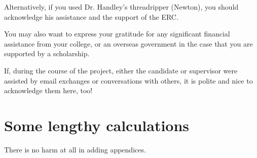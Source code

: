 \documentclass[aps,prd,reprint,preprintnumbers,showpacs,floatfix,nofootinbib,superscript address]{revtex4-2}
\begin{document}
Alternatively, if you used Dr. Handley's threadripper (Newton), you should acknowledge his assistance and the support of the ERC.

You may also want to express your gratitude for any significant financial assistance from your college, or an overseas government in the case that you are supported by a scholarship.

If, during the course of the project, either the candidate or supervisor were assisted by email exchanges or conversations with others, it is polite and nice to acknowledge them here, too!




\appendix
\section{Some lengthy calculations}\label{Appendix}
There is no harm at all in adding appendices.
\end{document}
